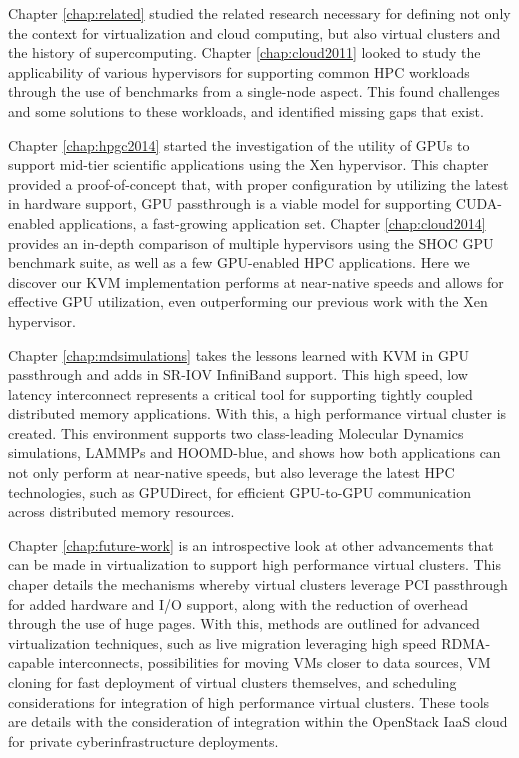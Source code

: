 
Chapter \ref{chap:related} studied the related research necessary for defining not only the context for virtualization and cloud computing, but also virtual clusters and the history of supercomputing.  Chapter \ref{chap:cloud2011} looked to study the applicability of various hypervisors for supporting common HPC workloads through the use of benchmarks from a single-node aspect.  This found challenges and some solutions to these workloads, and identified missing gaps that exist. 

Chapter \ref{chap:hpgc2014} started the investigation of the utility of GPUs to support mid-tier scientific applications using the Xen hypervisor. This chapter provided a proof-of-concept that, with proper configuration by utilizing the latest in hardware support, GPU passthrough is a viable model for supporting CUDA-enabled applications, a fast-growing application set. Chapter \ref{chap:cloud2014} provides an in-depth comparison of multiple hypervisors using the SHOC GPU benchmark suite, as well as a few GPU-enabled HPC applications. Here we discover our KVM implementation performs at near-native speeds and allows for effective GPU utilization, even outperforming our previous work with the Xen hypervisor. 

Chapter \ref{chap:mdsimulations} takes the lessons learned with KVM in GPU passthrough and adds in SR-IOV InfiniBand support. This high speed, low latency interconnect represents a critical tool for supporting tightly coupled distributed memory applications. With this, a high performance virtual cluster is created. This environment supports two class-leading Molecular Dynamics simulations, LAMMPs and HOOMD-blue, and shows how both applications can not only perform at near-native speeds, but also leverage the latest HPC technologies, such as GPUDirect, for efficient GPU-to-GPU communication across distributed memory resources. %

Chapter \ref{chap:future-work} is an introspective look at other advancements that can be made in virtualization to support high performance virtual clusters. This chaper details the mechanisms whereby virtual clusters leverage PCI passthrough for added hardware and I/O support, along with the reduction of overhead through the use of huge pages.  With this, methods are outlined for advanced virtualization techniques, such as live migration leveraging high speed RDMA-capable interconnects, possibilities for moving VMs closer to data sources, VM cloning for fast deployment of virtual clusters themselves, and scheduling considerations for integration of high performance virtual clusters. These tools are details with the consideration of integration within the OpenStack IaaS cloud for private cyberinfrastructure deployments.


